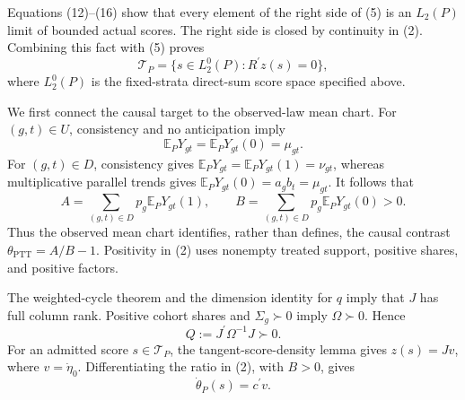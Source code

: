 Equations (12)--(16) show that every element of the right side of (5) is an \(L_2(P)\) limit of bounded actual scores.  The right side is closed by continuity in (2).  Combining this fact with (5) proves
\[
\mathcal T_P=\{s\in L_2^0(P):R^{\prime}z(s)=0\},
\]
where \(L_2^0(P)\) is the fixed-strata direct-sum score space specified above.

We first connect the causal target to the observed-law mean chart.  For \((g,t)\in U\), consistency and no anticipation imply
\[
\mathbb E_PY_{gt}=\mathbb E_PY_{gt}(0)=\mu_{gt}.                        \tag{1}
\]
For \((g,t)\in D\), consistency gives
\(\mathbb E_PY_{gt}=\mathbb E_PY_{gt}(1)=\nu_{gt}\), whereas multiplicative parallel trends gives
\(\mathbb E_PY_{gt}(0)=a_gb_t=\mu_{gt}\).  It follows that
\[
A=\sum_{(g,t)\in D}p_g\mathbb E_PY_{gt}(1),
\qquad
B=\sum_{(g,t)\in D}p_g\mathbb E_PY_{gt}(0)>0.                           \tag{2}
\]
Thus the observed mean chart identifies, rather than defines, the causal contrast
\(\theta_{\mathrm{PTT}}=A/B-1\).  Positivity in (2) uses nonempty treated support, positive shares, and positive factors.

The weighted-cycle theorem and the dimension identity for \(q\) imply that \(J\) has full column rank.  Positive cohort shares and \(\Sigma_g\succ0\) imply
\(\Omega\succ0\).  Hence
\[
Q:=J^{\prime}\Omega^{-1}J\succ0.                                      \tag{3}
\]
For an admitted score \(s\in\mathcal T_P\), the tangent-score-density lemma gives
\(z(s)=Jv\), where \(v=\dot\eta_0\).  Differentiating the ratio in (2), with \(B>0\), gives
\[
\dot\theta_P(s)=c^{\prime}v.                                          \tag{4}
\]

